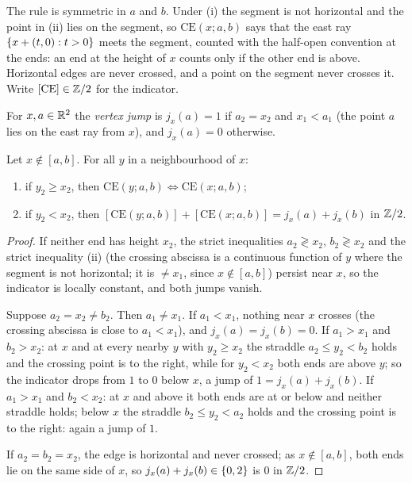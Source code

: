 
The rule is symmetric in $a$ and $b$. Under (i) the segment is not horizontal and the point in (ii)
lies on the segment, so $\mathrm{CE}(x;a,b)$ says that the east ray $\left\{ x+(t,0):t>0 \right\}$ meets the
segment, counted with the half-open convention at the ends: an end at the height of $x$ counts only
if the other end is above. Horizontal edges are never crossed, and a point on the segment never
crosses it. Write $[\mathrm{CE}]\in\mathbb{Z}/2$ for the indicator.

\begin{definition}
For $x,a\in\mathbb{R}^2$ the \emph{vertex jump} is $j_x(a)=1$ if $a_2=x_2$ and $x_1<a_1$ (the point $a$ lies
on the east ray from $x$), and $j_x(a)=0$ otherwise.
\end{definition}


\begin{lemma}\label{lem:vertex-rule}
Let $x\notin[a,b]$. For all $y$ in a neighbourhood of $x$:
\begin{enumerate}[label=(\alph*)]
\item if $y_2\ge x_2$, then $\mathrm{CE}(y;a,b)\iff\mathrm{CE}(x;a,b)$;
\item if $y_2<x_2$, then $[\mathrm{CE}(y;a,b)]+[\mathrm{CE}(x;a,b)]=j_x(a)+j_x(b)$ in $\mathbb{Z}/2$.
\end{enumerate}
\end{lemma}

\begin{proof}
If neither end has height $x_2$, the strict inequalities $a_2\gtrless x_2$, $b_2\gtrless x_2$ and the
strict inequality (ii) (the crossing abscissa is a continuous function of $y$ where the segment is
not horizontal; it is $\neq x_1$, since $x\notin[a,b]$) persist near $x$, so the indicator is
locally constant, and both jumps vanish.

Suppose $a_2=x_2\neq b_2$. Then $a_1\neq x_1$. If $a_1<x_1$, nothing near $x$ crosses (the crossing
abscissa is close to $a_1<x_1$), and $j_x(a)=j_x(b)=0$. If $a_1>x_1$ and $b_2>x_2$: at $x$ and at
every nearby $y$ with $y_2\ge x_2$ the straddle $a_2\le y_2<b_2$ holds and the crossing point is to the
right, while for $y_2<x_2$ both ends are above $y$; so the indicator drops from $1$ to $0$ below
$x$, a jump of $1=j_x(a)+j_x(b)$. If $a_1>x_1$ and $b_2<x_2$: at $x$ and above it both ends are at or
below and neither straddle holds; below $x$ the straddle $b_2\le y_2<a_2$ holds and the crossing point
is to the right: again a jump of $1$.

If $a_2=b_2=x_2$, the edge is horizontal and never crossed; as $x\notin[a,b]$, both ends lie on the
same side of $x$, so $j_x(a)+j_x(b)\in\left\{ 0,2 \right\}$ is $0$ in $\mathbb{Z}/2$.
\end{proof}

